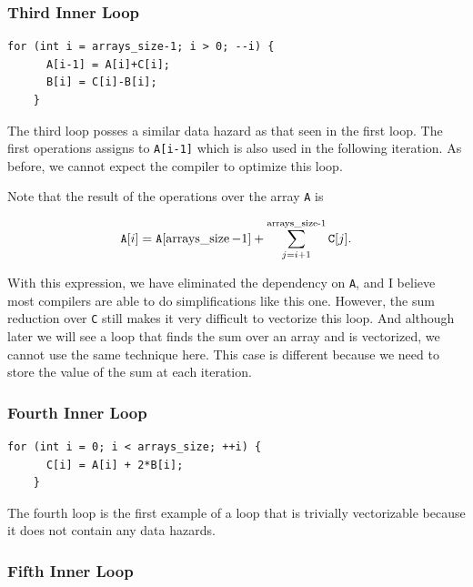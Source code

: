 \documentclass[
    12pt, %
]{fphw}
\newcommand{\tech}{\texttt}
\begin{document}
\subsubsection{Third Inner Loop}

\begin{lstlisting}[gobble=4]
    for (int i = arrays_size-1; i > 0; --i) {
      A[i-1] = A[i]+C[i];
      B[i] = C[i]-B[i];
    }

\end{lstlisting}

    The third loop posses a similar data hazard as that seen in the first loop.
The first operations assigns to \tech{A[i-1]} which is also used in the following iteration.
As before, we cannot expect the compiler to optimize this loop.

    Note that the result of the operations over the array \tech{A} is

\begin{equation*}
    \text{\tech{A}}[i] = \text{\tech{A}}[\operatorname{arrays\_size}-1] +
        \sum_{j=i+1}^{\operatorname{arrays\_size-1}} \text{\tech{C}}[j].
\end{equation*}

\noindent
    With this expression, we have eliminated the dependency on \tech{A},
and I believe most compilers are able to do simplifications like this one.
However, the sum reduction over \tech{C} still makes it very difficult to vectorize this loop.
And although later we will see a loop that finds the sum over an array and is vectorized,
we cannot use the same technique here.
This case is different because we need to store the value of the sum at each iteration.

\subsubsection{Fourth Inner Loop}

\begin{lstlisting}[gobble=4]
    for (int i = 0; i < arrays_size; ++i) {
      C[i] = A[i] + 2*B[i];
    }

\end{lstlisting}

    The fourth loop is the first example of a loop that is trivially vectorizable
because it does not contain any data hazards.

\subsubsection{Fifth Inner Loop}
\end{document}
